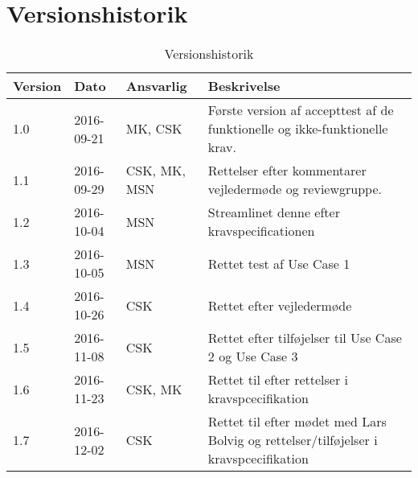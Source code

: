 \chapter{Versionshistorik}\label{Versionshistorik}

\begin{table}[htb]
\begin{tabular}{ | l | l | l | p{} | }
\hline
\textbf{Version} & \textbf{Dato} & \textbf{Ansvarlig} & \textbf{Beskrivelse} \\\hline
1.0 & 2016-09-21 & MK, CSK & Første version af accepttest af de funktionelle og ikke-funktionelle krav.\\\hline
1.1 & 2016-09-29 & CSK, MK, MSN & Rettelser efter kommentarer vejledermøde og reviewgruppe. \\\hline
1.2 & 2016-10-04 & MSN & Streamlinet denne efter kravspecificationen \\\hline
1.3 & 2016-10-05 & MSN & Rettet test af Use Case 1 \\\hline
1.4 & 2016-10-26 & CSK & Rettet efter vejledermøde \\\hline
1.5 & 2016-11-08 & CSK & Rettet efter tilføjelser til Use Case 2 og Use Case 3 \\\hline
1.6 & 2016-11-23 & CSK, MK & Rettet til efter rettelser i kravspcecifikation \\\hline
1.7 & 2016-12-02 & CSK & Rettet til efter mødet med Lars Bolvig og rettelser/tilføjelser i kravspcecifikation \\\hline
\end{tabular}
\caption{Versionshistorik}
\end{table}
\newpage 